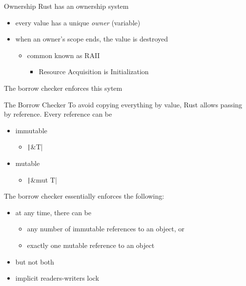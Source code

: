 \begin{frame}{Ownership}
    \pause
    Rust has an \alert{ownership} system
    \pause
    \begin{itemize}[<+->]
        \item every value has a \alert{unique} \emph{owner} (variable)
        \item when an owner's scope ends, the value is destroyed
        \begin{itemize}[<+->]
            \item common known as RAII
            \begin{itemize}[<+->]
                \item Resource Acquisition is Initialization
            \end{itemize}
        \end{itemize}
    \end{itemize}
    \pause
    The \alert{borrow checker} enforces this sytem
\end{frame}

\begin{frame}{The Borrow Checker}
    \pause
    To avoid copying everything by value, Rust allows passing by
    reference. Every reference can be
    \pause
    \begin{itemize}[<+->]
        \item immutable
        \begin{itemize}[<+->]
            \item \texttt|&T|
        \end{itemize}
        \item mutable
        \begin{itemize}[<+->]
            \item \texttt|&mut T|
        \end{itemize}
    \end{itemize}
    \pause The borrow checker essentially enforces the following:\pause
    \begin{itemize}[<+->]
        \item at any time, there can be
        \begin{itemize}[<+->]
            \item any number of immutable references to an object, or
            \item \alert{exactly one} mutable reference to an object
        \end{itemize}
        \item but not both
        \item implicit readers-writers lock
    \end{itemize}
\end{frame}

